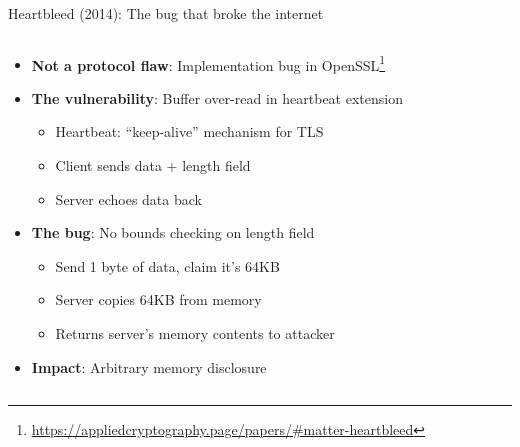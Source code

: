 \documentclass[aspectratio=169, lualatex, handout]{beamer}
\begin{document}
\begin{frame}{Heartbleed (2014): The bug that broke the internet}
	\begin{columns}[c]
		\begin{column}{1\textwidth}
			\begin{itemize}[<+->]
				\item \textbf{Not a protocol flaw}: Implementation bug in OpenSSL\footnote{\url{https://appliedcryptography.page/papers/\#matter-heartbleed}}
				\item \textbf{The vulnerability}: Buffer over-read in heartbeat extension
				      \begin{itemize}
					      \item Heartbeat: ``keep-alive'' mechanism for TLS
					      \item Client sends data + length field
					      \item Server echoes data back
				      \end{itemize}
				\item \textbf{The bug}: No bounds checking on length field
				      \begin{itemize}
					      \item Send 1 byte of data, claim it's 64KB
					      \item Server copies 64KB from memory
					      \item Returns server's memory contents to attacker
				      \end{itemize}
				\item \textbf{Impact}: Arbitrary memory disclosure
			\end{itemize}
		\end{column}
	\end{columns}
\end{frame}
\end{document}
